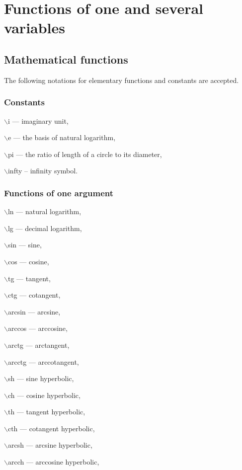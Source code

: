 \chapter{ Functions of one and several variables}
\section{Mathematical functions}
The following notations for elementary functions and constants are accepted.

\subsection{Constants}
\hspace*{4mm}
$\backslash$i --- imaginary unit, 

$\backslash$e --- the basis of natural logarithm,

$\backslash$pi --- the ratio of length of a circle to its diameter,

$\backslash$infty -- infinity symbol.


\subsection{Functions of one argument}

\hspace*{4mm}
$\backslash$ln --- natural logarithm,

$\backslash$lg --- decimal logarithm,

$\backslash$sin --- sine,

$\backslash$cos --- cosine,

$\backslash$tg --- tangent,

$\backslash$ctg --- cotangent,

$\backslash$arcsin --- arcsine,

$\backslash$arccos --- arccosine,

$\backslash$arctg --- arctangent,

$\backslash$arcctg --- arccotangent,

$\backslash$sh --- sine hyperbolic,

$\backslash$ch --- cosine hyperbolic,

$\backslash$th --- tangent hyperbolic,

$\backslash$cth --- cotangent hyperbolic,

$\backslash$arcsh --- arcsine hyperbolic,

$\backslash$arcch --- arccosine hyperbolic,

